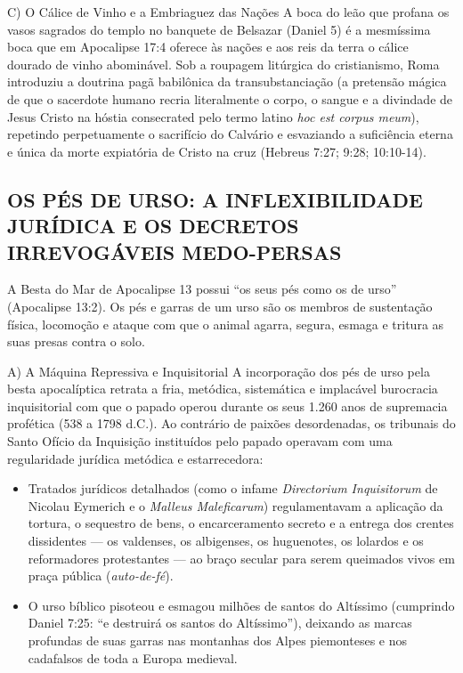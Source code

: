 \documentclass[11pt,a4paper,openany]{book}
\begin{document}
C) O Cálice de Vinho e a Embriaguez das Nações
A boca do leão que profana os vasos sagrados do templo no banquete de Belsazar (Daniel 5) é a mesmíssima boca que em Apocalipse 17:4 oferece às nações e aos reis da terra o cálice dourado de vinho abominável. Sob a roupagem litúrgica do cristianismo, Roma introduziu a doutrina pagã babilônica da transubstanciação (a pretensão mágica de que o sacerdote humano recria literalmente o corpo, o sangue e a divindade de Jesus Cristo na hóstia consecrated pelo termo latino \textit{hoc est corpus meum}), repetindo perpetuamente o sacrifício do Calvário e esvaziando a suficiência eterna e única da morte expiatória de Cristo na cruz (Hebreus 7:27; 9:28; 10:10-14).



\subsection{OS PÉS DE URSO: A INFLEXIBILIDADE JURÍDICA E OS DECRETOS IRREVOGÁVEIS MEDO-PERSAS}


A Besta do Mar de Apocalipse 13 possui ``os seus pés como os de urso'' (Apocalipse 13:2). Os pés e garras de um urso são os membros de sustentação física, locomoção e ataque com que o animal agarra, segura, esmaga e tritura as suas presas contra o solo.

A) A Máquina Repressiva e Inquisitorial
A incorporação dos pés de urso pela besta apocalíptica retrata a fria, metódica, sistemática e implacável burocracia inquisitorial com que o papado operou durante os seus 1.260 anos de supremacia profética (538 a 1798 d.C.). Ao contrário de paixões desordenadas, os tribunais do Santo Ofício da Inquisição instituídos pelo papado operavam com uma regularidade jurídica metódica e estarrecedora:
\begin{itemize}
  \item Tratados jurídicos detalhados (como o infame \textit{Directorium Inquisitorum} de Nicolau Eymerich e o \textit{Malleus Maleficarum}) regulamentavam a aplicação da tortura, o sequestro de bens, o encarceramento secreto e a entrega dos crentes dissidentes — os valdenses, os albigenses, os huguenotes, os lolardos e os reformadores protestantes — ao braço secular para serem queimados vivos em praça pública (\textit{auto-de-fé}).
  \item O urso bíblico pisoteou e esmagou milhões de santos do Altíssimo (cumprindo Daniel 7:25: ``e destruirá os santos do Altíssimo''), deixando as marcas profundas de suas garras nas montanhas dos Alpes piemonteses e nos cadafalsos de toda a Europa medieval.
\end{itemize}
\end{document}
